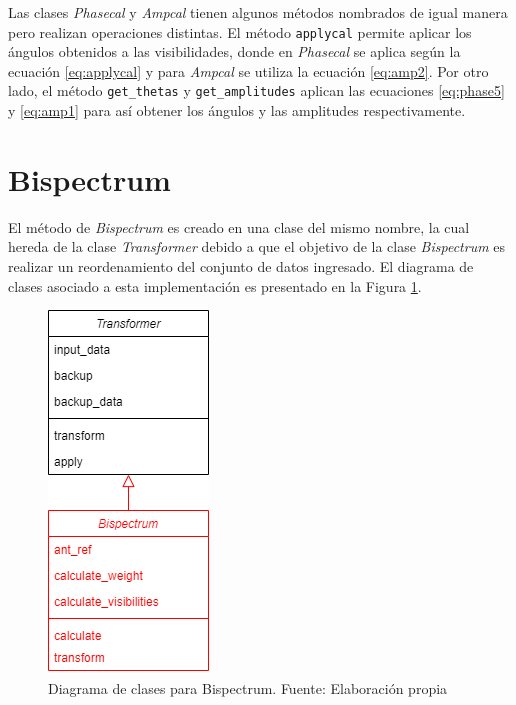 Las clases \textit{Phasecal} y \textit{Ampcal} tienen algunos métodos nombrados de igual manera pero realizan operaciones distintas. El método \texttt{applycal} permite aplicar los ángulos obtenidos a las visibilidades, donde en \textit{Phasecal} se aplica según la ecuación \ref{eq:applycal} y para \textit{Ampcal} se utiliza la ecuación \ref{eq:amp2}. Por otro lado, el método \texttt{get\_thetas} y \texttt{get\_amplitudes} aplican las ecuaciones \ref{eq:phase5} y \ref{eq:amp1} para así obtener los ángulos y las amplitudes respectivamente. 


\section{Bispectrum}

El método de \textit{Bispectrum} es creado en una clase del mismo nombre, la cual hereda de la clase \textit{Transformer} debido a que el objetivo de la clase \textit{Bispectrum} es realizar un reordenamiento del conjunto de datos ingresado. El diagrama de clases asociado a esta implementación es presentado en la Figura \ref{fig:bispectrum_diagram}.

\begin{figure}[!ht]
	\centering
	\captionsetup{justification=centering}
	\includegraphics[scale=0.5]{images/Pyralysis-Bispectrum.png}
	\caption[Diagrama de clases para Bispectrum]{Diagrama de clases para Bispectrum. Fuente: Elaboración propia}
	\label{fig:bispectrum_diagram}
\end{figure}

